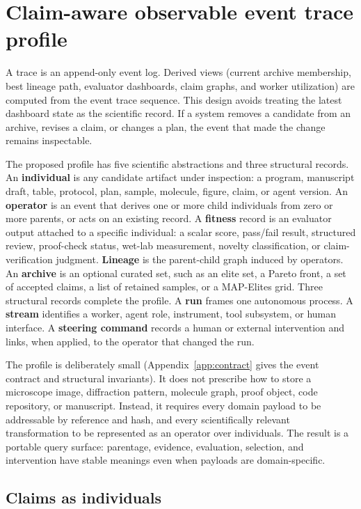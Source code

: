 \documentclass{article}
\begin{document}
\section{Claim-aware observable event trace profile}

A trace is an append-only event log. Derived views (current archive membership, best lineage path, evaluator dashboards, claim graphs, and worker utilization) are computed from the event trace sequence. This design avoids treating the latest dashboard state as the scientific record. If a system removes a candidate from an archive, revises a claim, or changes a plan, the event that made the change remains inspectable.

The proposed profile has five scientific abstractions and three structural records. An \textbf{individual} is any candidate artifact under inspection: a program, manuscript draft, table, protocol, plan, sample, molecule, figure, claim, or agent version. An \textbf{operator} is an event that derives one or more child individuals from zero or more parents, or acts on an existing record. A \textbf{fitness} record is an evaluator output attached to a specific individual: a scalar score, pass/fail result, structured review, proof-check status, wet-lab measurement, novelty classification, or claim-verification judgment. \textbf{Lineage} is the parent-child graph induced by operators. An \textbf{archive} is an optional curated set, such as an elite set, a Pareto front, a set of accepted claims, a list of retained samples, or a MAP-Elites grid. Three structural records complete the profile. A \textbf{run} frames one autonomous process. A \textbf{stream} identifies a worker, agent role, instrument, tool subsystem, or human interface. A \textbf{steering command} records a human or external intervention and links, when applied, to the operator that changed the run.

The profile is deliberately small (Appendix~\ref{app:contract} gives the event contract and structural invariants). It does not prescribe how to store a microscope image, diffraction pattern, molecule graph, proof object, code repository, or manuscript. Instead, it requires every domain payload to be addressable by reference and hash, and every scientifically relevant transformation to be represented as an operator over individuals. The result is a portable query surface: parentage, evidence, evaluation, selection, and intervention have stable meanings even when payloads are domain-specific.

\subsection{Claims as individuals}
\end{document}
